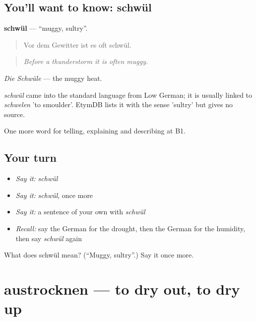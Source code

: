 \subsection*{You'll want to know: schwül}
\textbf{schwül} — \textquotedblleft{}muggy, sultry\textquotedblright{}.

\begin{quote}
Vor dem Gewitter ist es oft schwül.
\end{quote}

\begin{quote}
\emph{Before a thunderstorm it is often muggy.}
\end{quote}

\emph{Die Schwüle} — the muggy heat.

\begin{cousinweb}
\emph{schwül} came into the standard language from Low German; it is usually linked to \emph{schwelen} 'to smoulder'. EtymDB lists it with the sense 'sultry' but gives no source.
\end{cousinweb}

\begin{grammarlens}[title={What you've built}]
One more word for telling, explaining and describing at B1.
\end{grammarlens}

\subsection*{Your turn}
\begin{itemize}
\raggedright
  \item \emph{Say it:} \emph{schwül}
  \item \emph{Say it:} \emph{schwül}, once more
  \item \emph{Say it:} a sentence of your own with \emph{schwül}
  \item \emph{Recall:} say the German for the drought, then the German for the humidity, then say \emph{schwül} again
\end{itemize}

\begin{tcolorbox}[breakable,colback=teal!4,colframe=teal!35!black,title={Before you move on}]
What does schwül mean? (\textquotedblleft{}Muggy, sultry\textquotedblright{}.) Say it once more.
\end{tcolorbox}
\section[austrocknen]{austrocknen — to dry out, to dry up}

